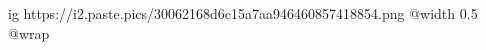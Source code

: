  
 
 
 
 

\ifcmt
  ig https://i2.paste.pics/30062168d6c15a7aa946460857418854.png
  @width 0.5
  @wrap 
\fi
